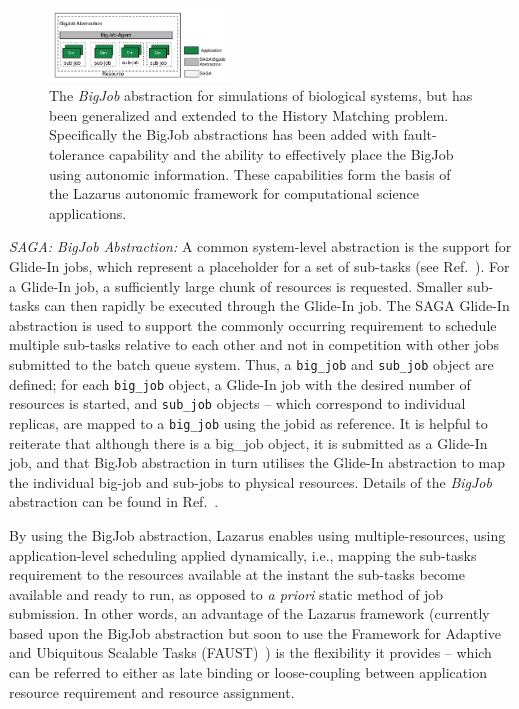 \documentclass{sig-alternate}
\newcommand{\up}{\vspace*{-0.3em}}
\begin{document}
\begin{figure}[t]
      \centering
      \includegraphics[width=0.430\textwidth]{./figures/enkf_bigjob.pdf}
      \caption{\footnotesize The {\it BigJob} abstraction for simulations of
        biological systems, but has been generalized and extended to
        the History Matching problem. Specifically the BigJob
        abstractions has been added with fault-tolerance capability
        and the ability to effectively place the BigJob using
        autonomic information. These capabilities form the basis of
        the Lazarus autonomic framework for computational science
        applications.}
      \label{fig:abstractions}\up\up\up \up\up\up
\end{figure}

{\it SAGA: BigJob Abstraction:} A common system-level abstraction is
the support for Glide-In jobs, which represent a placeholder for a
set of sub-tasks (see Ref.~\cite{saga_royalsoc}).  For a Glide-In
job, a sufficiently large chunk of resources is requested. Smaller
sub-tasks can then rapidly be executed through the Glide-In job.
The SAGA Glide-In abstraction is used to support the commonly
occurring requirement to schedule multiple sub-tasks relative to each
other and not in competition with other jobs submitted to the batch
queue system.  Thus, a \texttt{big\_job} and \texttt{sub\_job} object
are defined; for each \texttt{big\_job} object, a Glide-In job with
the desired number of resources is started, and \texttt{sub\_job}
objects -- which correspond to individual replicas, are mapped to a
\texttt{big\_job} using the jobid as reference. It is helpful to
reiterate that although there is a big\_job object, it is submitted as
a Glide-In job, and that BigJob abstraction in turn utilises the
Glide-In abstraction to map the individual big-job and sub-jobs to
physical resources.  Details of the \emph{BigJob} abstraction can be
found in Ref.~\cite{saga_royalsoc}.

By using the BigJob abstraction, Lazarus enables using multiple-resources, using application-level scheduling applied dynamically, i.e., mapping the sub-tasks requirement to the resources available at the instant the sub-tasks become available and ready to run, as opposed to {\it a priori} static method of job submission.  In other words, an advantage of the Lazarus framework (currently based upon the BigJob abstraction but soon to use the Framework for Adaptive and Ubiquitous Scalable Tasks (FAUST)~\cite{faust_url}) is the flexibility it provides -- which can be referred to either as late binding or loose-coupling between application resource requirement and resource assignment.
\end{document}
